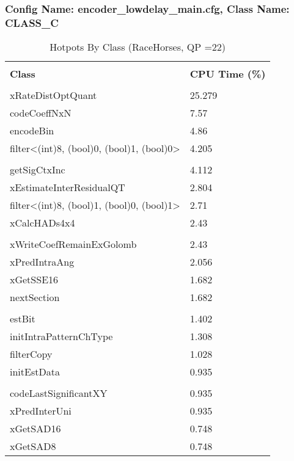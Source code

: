 \documentclass{article}%
\begin{document}
\subsubsection{Config Name: encoder\_lowdelay\_main.cfg, Class Name: CLASS\_C}%
\label{ssubsec:ConfigNameencoderlowdelaymain.cfg,ClassNameCLASSC}%
\begin{longtabu}{| X[l] | X[l] |}%
\caption{%
Hotpots By Class (RaceHorses, QP =22)%
}%
\hline%
&\\%
\textbf{Class}&\textbf{CPU Time (\%)}\\%
&\\%
\hline%
\endhead%
xRateDistOptQuant&25.279\\%
\hline%
codeCoeffNxN&7.57\\%
\hline%
encodeBin&4.86\\%
\hline%
filter<(int)8, (bool)0, (bool)1, (bool)0>&4.205\\%
\hline%
&\\%
\hline%
getSigCtxInc&4.112\\%
\hline%
xEstimateInterResidualQT&2.804\\%
\hline%
filter<(int)8, (bool)1, (bool)0, (bool)1>&2.71\\%
\hline%
xCalcHADs4x4&2.43\\%
\hline%
&\\%
\hline%
xWriteCoefRemainExGolomb&2.43\\%
\hline%
xPredIntraAng&2.056\\%
\hline%
xGetSSE16&1.682\\%
\hline%
nextSection&1.682\\%
\hline%
&\\%
\hline%
estBit&1.402\\%
\hline%
initIntraPatternChType&1.308\\%
\hline%
filterCopy&1.028\\%
\hline%
initEstData&0.935\\%
\hline%
&\\%
\hline%
codeLastSignificantXY&0.935\\%
\hline%
xPredInterUni&0.935\\%
\hline%
xGetSAD16&0.748\\%
\hline%
xGetSAD8&0.748\\%
\hline%
\end{longtabu}%
\newpage%
\end{document}
